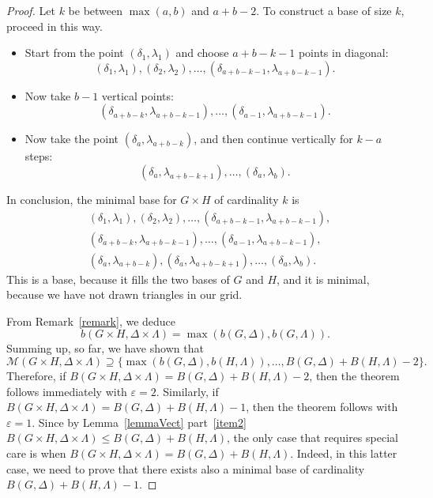 \documentclass{amsart}
\begin{document}
\begin{proof}
		Let $k$ be between $\max(a,b)$ and $a+b-2$. To construct a base of size $k$, proceed in this way.
		\begin{itemize}
			\item Start from the point $(\delta_1,\lambda_1)$ and choose $a+b-k-1$ points in diagonal: 
			\[
			(\delta_1,\lambda_1), (\delta_2,\lambda_2), \dots, (\delta_{a+b-k-1},\lambda_{a+b-k-1}).
			\]
			\item Now take $b-1$ vertical points:
			\[
			(\delta_{a+b-k},\lambda_{a+b-k-1}),\dots,(\delta_{a-1},\lambda_{a+b-k-1}).
			\]
			\item Now take the point $(\delta_a,\lambda_{a+b-k})$, and then continue  vertically for $k-a$ steps:
			\[
			(\delta_a, \lambda_{a+b-k+1}),\dots, (\delta_a,\lambda_b).
			\]
		\end{itemize}
		In conclusion, the minimal base for $G\times H$ of cardinality $k$ is
		\begin{align*}
			&(\delta_1,\lambda_1), (\delta_2,\lambda_2), \dots, (\delta_{a+b-k-1},\lambda_{a+b-k-1}),\\
			&	(\delta_{a+b-k},\lambda_{a+b-k-1}),\dots,(\delta_{a-1},\lambda_{a+b-k-1}), \\
			&(\delta_a,\lambda_{a+b-k}),	(\delta_a, \lambda_{a+b-k+1}),\dots, (\delta_a,\lambda_b).
		\end{align*}
		This is a base, because it fills the two bases of $G$ and $H$, and it is minimal, because we have not drawn triangles in our grid.
		
		From Remark~\ref{remark}, we deduce
		$$b(G\times H,\Delta\times\Lambda)=\max(b(G,\Delta),b(G,\Lambda)).$$
Summing up, so far, we have shown that
$$\mathcal{M}(G\times H,\Delta\times \Lambda)\supseteq\{
\max(b(G,\Delta),b(H,\Lambda)),\ldots,B(G,\Delta)+B(H,\Lambda)-2\}.$$
Therefore, if $B(G\times H,\Delta\times \Lambda)=B(G,\Delta)+B(H,\Lambda)-2$, then the theorem follows immediately with $\varepsilon=2$. Similarly, if 	$B(G\times H,\Delta\times \Lambda)=B(G,\Delta)+B(H,\Lambda)-1$, then the theorem follows with $\varepsilon=1$. Since by Lemma~\ref{lemmaVect} part~\eqref{item2} $B(G\times H,\Delta\times \Lambda)\le B(G,\Delta)+B(H,\Lambda)$, the only case that requires special care is when $B(G\times H,\Delta\times \Lambda)=B(G,\Delta)+B(H,\Lambda)$. Indeed, in this latter case, we need to prove that there exists also a minimal base of cardinality $B(G,\Delta) + B(H,\Lambda)-1$. 


\end{proof}
\end{document}
